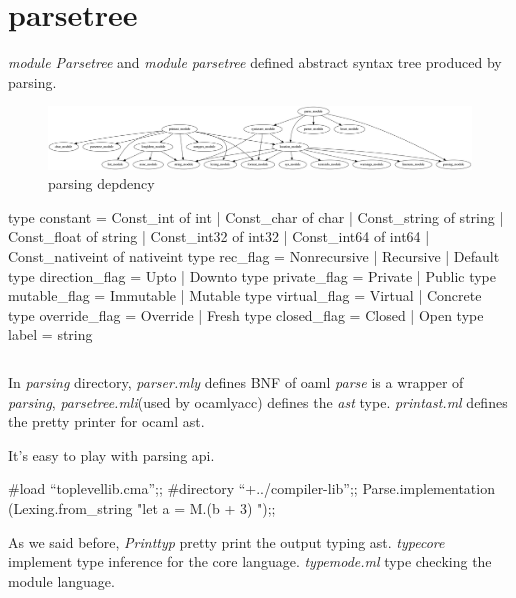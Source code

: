 

\section{parsetree}

\textit{module Parsetree} and \textit{module parsetree}
defined abstract syntax tree produced by parsing.

\begin{figure}
  \centering
  \includegraphics[scale=0.2,angle=-90]{graphics/parsing_dep.png}
  \caption{parsing depdency}
  \label{fig:parsing_dep}
\end{figure}


\begin{ocamlcode}
type constant =
    Const_int of int
  | Const_char of char
  | Const_string of string
  | Const_float of string
  | Const_int32 of int32
  | Const_int64 of int64
  | Const_nativeint of nativeint
type rec_flag = Nonrecursive | Recursive | Default
type direction_flag = Upto | Downto
type private_flag = Private | Public
type mutable_flag = Immutable | Mutable
type virtual_flag = Virtual | Concrete
type override_flag = Override | Fresh
type closed_flag = Closed | Open
type label = string
\end{ocamlcode}

\newpage
\inputminted[fontsize=\scriptsize]{ocaml}{code/compiler/ast.ml}

In \textit{parsing} directory, \textit{parser.mly} defines BNF of oaml
\textit{parse} is a wrapper of \textit{parsing},
\textit{parsetree.mli}(used by ocamlyacc) defines the \textit{ast}
type. \textit{printast.ml} defines the pretty printer for ocaml ast.

It's easy to play with parsing api.

\begin{ocamlcode}
  #load ``toplevellib.cma'';;
  #directory ``+../compiler-lib'';;
  Parse.implementation (Lexing.from_string "let a =  M.(b + 3) ");;
\end{ocamlcode}

As we said before, \textit{Printtyp} pretty print the output typing
ast. \textit{typecore} implement type inference for the core language.
\textit{typemode.ml} type checking the module language.
